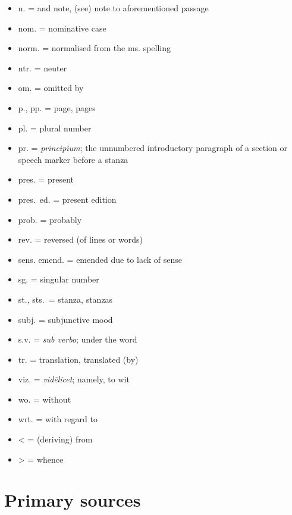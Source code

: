 \begin{itemize}
	\item n. = and note, (see) note to aforementioned passage
	\item nom. = nominative case
	\item norm. = normalised from the ms. spelling
	\item ntr. = neuter
	\item om. = omitted by
	\item p., pp. = page, pages
	\item pl. = plural number
	\item pr. = \emph{principium}; the unnumbered introductory paragraph of a section or speech marker before a stanza
	\item pres. = present
	\item pres.~ed. = present edition
	\item prob. = probably
	\item rev. = reversed (of lines or words)
	\item sens. emend. = emended due to lack of sense
	\item sg. = singular number
	\item st., sts.~= stanza, stanzas
	\item subj. = subjunctive mood
	\item s.v. = \emph{sub verbo}; under the word
	\item tr. = translation, translated (by)
	\item viz. = \emph{vidēlicet}; namely, to wit
	\item wo. = without
	\item wrt. = with regard to
	\item < = (deriving) from
	\item > = whence
\end{itemize}

\newcommand{\CV}{%
	\textciteshorthand{CleasbyVigfusson}%
}
\newcommand{\FGT}{%
	\textciteshorthand{FGTHaugen}%
}
\newcommand{\GP}{%
	\textciteshorthand{GotlandicPictureStones}%
}
\newcommand{\ONP}{%
	\textciteshorthand{ONP}%
}
\newcommand{\Skp}{%
	\textciteshorthand{SkP}%
}

\section{Primary sources}

